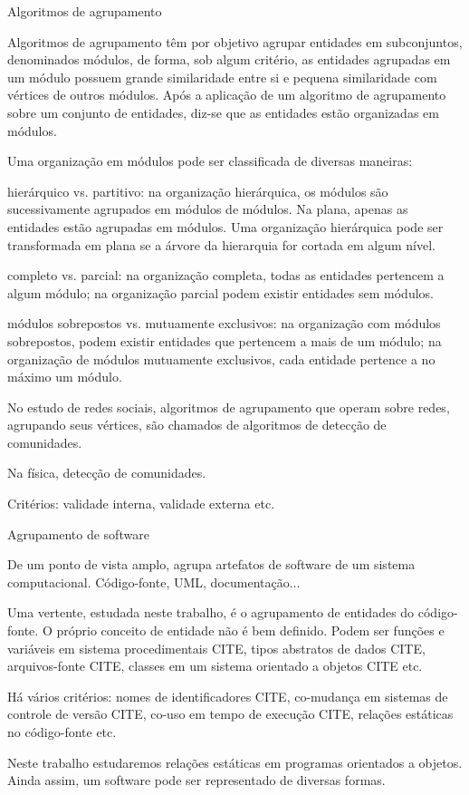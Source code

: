\begin{section}{Algoritmos de agrupamento}

Algoritmos de agrupamento têm por objetivo agrupar entidades em subconjuntos, denominados módulos, de forma, sob algum critério, as entidades agrupadas em um módulo possuem grande similaridade entre si e pequena similaridade com vértices de outros módulos. Após a aplicação de um algoritmo de agrupamento sobre um conjunto de entidades, diz-se que as entidades estão organizadas em módulos.


Uma organização em módulos pode ser classificada de diversas maneiras:

hierárquico vs. partitivo: na organização hierárquica, os módulos são sucessivamente agrupados em módulos de módulos. Na plana, apenas as entidades estão agrupadas em módulos. Uma organização hierárquica pode ser transformada em plana se a árvore da hierarquia for cortada em algum nível.

completo vs. parcial: na organização completa, todas as entidades pertencem a algum módulo; na organização parcial podem existir entidades sem módulos.

módulos sobrepostos vs. mutuamente exclusivos: na organização com módulos sobrepostos, podem existir entidades que pertencem a mais de um módulo; na organização de módulos mutuamente exclusivos, cada entidade pertence a no máximo um módulo.


No estudo de redes sociais, algoritmos de agrupamento que operam sobre redes, agrupando seus vértices, são chamados de algoritmos de detecção de comunidades.

Na física, detecção de comunidades.

Critérios: validade interna, validade externa etc.

\end{section}
\begin{section}{Agrupamento de software}

De um ponto de vista amplo, agrupa artefatos de software de um sistema computacional. Código-fonte, UML, documentação...

Uma vertente, estudada neste trabalho, é o agrupamento de entidades do código-fonte. O próprio conceito de entidade não é bem definido. Podem ser funções e variáveis em sistema procedimentais CITE, tipos abstratos de dados CITE, arquivos-fonte CITE, classes em um sistema orientado a objetos CITE etc.

Há vários critérios: nomes de identificadores CITE, co-mudança em sistemas de controle de versão CITE, co-uso em tempo de execução CITE, relações estáticas no código-fonte etc.

Neste trabalho estudaremos relações estáticas em programas orientados a objetos. Ainda assim, um software pode ser representado de diversas formas.

\end{section}
